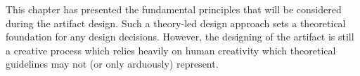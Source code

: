 
This chapter has presented the fundamental principles that will be considered during the artifact design. Such a theory-led design approach sets a theoretical foundation for any design decisions. However, the designing of the artifact is still a creative process which relies heavily on human creativity which theoretical guidelines may not (or only arduously) represent.
